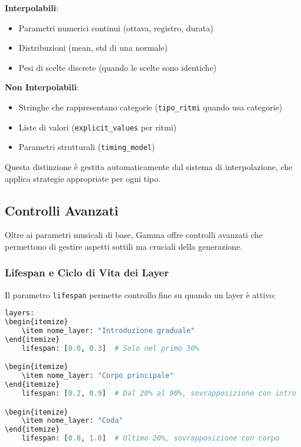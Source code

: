 \textbf{Interpolabili}:
\begin{itemize}
    \item Parametri numerici continui (ottava, registro, durata)
    \item Distribuzioni (mean, std di una normale)
    \item Pesi di scelte discrete (quando le scelte sono identiche)
\end{itemize}

\textbf{Non Interpolabili}:
\begin{itemize}
    \item Stringhe che rappresentano categorie (\texttt{tipo\_ritmi} quando usa categorie)
    \item Liste di valori (\texttt{explicit\_values} per ritmi)
    \item Parametri strutturali (\texttt{timing\_model})
\end{itemize}

Questa distinzione è gestita automaticamente dal sistema di interpolazione, che applica strategie appropriate per ogni tipo.
\subsection{Controlli Avanzati}
Oltre ai parametri musicali di base, Gamma offre controlli avanzati che permettono di gestire aspetti sottili ma cruciali della generazione.
\subsubsection{Lifespan e Ciclo di Vita dei Layer}
Il parametro \texttt{lifespan} permette controllo fine su quando un layer è attivo:

\begin{lstlisting}[language=Python]
layers:
\begin{itemize}
    \item nome_layer: "Introduzione graduale"
\end{itemize}
    lifespan: [0.0, 0.3]  # Solo nel primo 30%

\begin{itemize}
    \item nome_layer: "Corpo principale"  
\end{itemize}
    lifespan: [0.2, 0.9]  # Dal 20% al 90%, sovrapposizione con intro

\begin{itemize}
    \item nome_layer: "Coda"
\end{itemize}
    lifespan: [0.8, 1.0]  # Ultimo 20%, sovrapposizione con corpo
\end{lstlisting}

